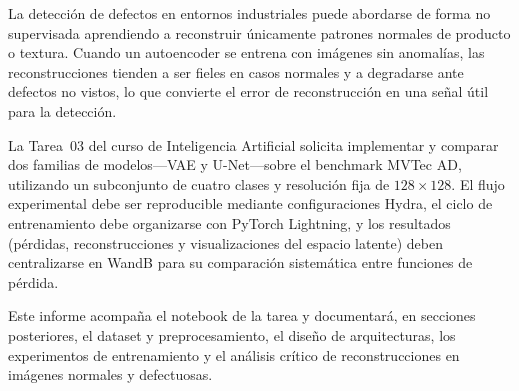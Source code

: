 \documentclass[conference]{IEEEtran}
\begin{document}
La detección de defectos en entornos industriales puede abordarse de forma no supervisada aprendiendo a reconstruir únicamente patrones normales de producto o textura. Cuando un autoencoder se entrena con imágenes sin anomalías, las reconstrucciones tienden a ser fieles en casos normales y a degradarse ante defectos no vistos, lo que convierte el error de reconstrucción en una señal útil para la detección.

La Tarea~03 del curso de Inteligencia Artificial solicita implementar y comparar dos familias de modelos---VAE y U-Net---sobre el benchmark MVTec AD, utilizando un subconjunto de cuatro clases y resolución fija de $128 \times 128$. El flujo experimental debe ser reproducible mediante configuraciones Hydra, el ciclo de entrenamiento debe organizarse con PyTorch Lightning, y los resultados (pérdidas, reconstrucciones y visualizaciones del espacio latente) deben centralizarse en WandB para su comparación sistemática entre funciones de pérdida.

Este informe acompaña el notebook de la tarea y documentará, en secciones posteriores, el dataset y preprocesamiento, el diseño de arquitecturas, los experimentos de entrenamiento y el análisis crítico de reconstrucciones en imágenes normales y defectuosas.
\end{document}
